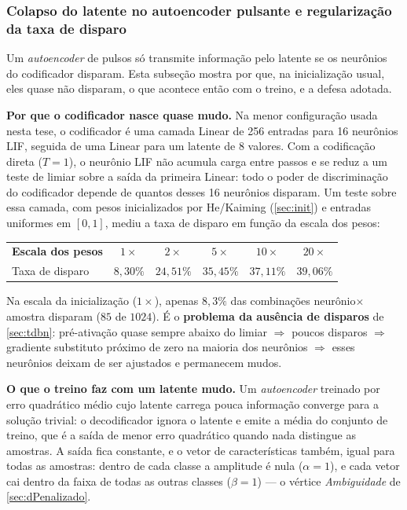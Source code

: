 			\subsubsection{Colapso do latente no autoencoder pulsante e regularização da taxa de disparo}
				\label{sec:snnAeFrReg}

				\par Um \textit{autoencoder} de pulsos só transmite informação pelo latente se os neurônios do codificador disparam. Esta subseção mostra por que, na inicialização usual, eles quase não disparam, o que acontece então com o treino, e a defesa adotada.

				\par \textbf{Por que o codificador nasce quase mudo.} Na menor configuração usada nesta tese, o codificador é uma camada Linear de 256 entradas para 16 neurônios LIF, seguida de uma Linear para um latente de 8 valores. Com a codificação direta ($T=1$), o neurônio LIF não acumula carga entre passos e se reduz a um teste de limiar sobre a saída da primeira Linear: todo o poder de discriminação do codificador depende de quantos desses 16 neurônios disparam. Um teste sobre essa camada, com pesos inicializados por He/Kaiming (\autoref{sec:init}) e entradas uniformes em $[0,1]$, mediu a taxa de disparo em função da escala dos pesos:

				\begin{center}
					\begin{tabular}{@{}lccccc@{}}
						\tableHeaderRow \textbf{Escala dos pesos} & $1\times$ & $2\times$ & $5\times$ & $10\times$ & $20\times$ \\
						Taxa de disparo & $8{,}30\%$ & $24{,}51\%$ & $35{,}45\%$ & $37{,}11\%$ & $39{,}06\%$ \\
						\bottomrule
					\end{tabular}
				\end{center}

				\par Na escala da inicialização ($1\times$), apenas $8{,}3\%$ das combinações neurônio$\times$amostra disparam ($85$ de $1024$). É o \textbf{problema da ausência de disparos} de \autoref{sec:tdbn}: pré-ativação quase sempre abaixo do limiar $\Rightarrow$ poucos disparos $\Rightarrow$ gradiente substituto próximo de zero na maioria dos neurônios $\Rightarrow$ esses neurônios deixam de ser ajustados e permanecem mudos.

				\par \textbf{O que o treino faz com um latente mudo.} Um \textit{autoencoder} treinado por erro quadrático médio cujo latente carrega pouca informação converge para a solução trivial: o decodificador ignora o latente e emite a média do conjunto de treino, que é a saída de menor erro quadrático quando nada distingue as amostras. A saída fica constante, e o vetor de características também, igual para todas as amostras: dentro de cada classe a amplitude é nula ($\alpha=1$), e cada vetor cai dentro da faixa de todas as outras classes ($\beta=1$) --- o vértice \textit{Ambiguidade} de \autoref{sec:dPenalizado}.


